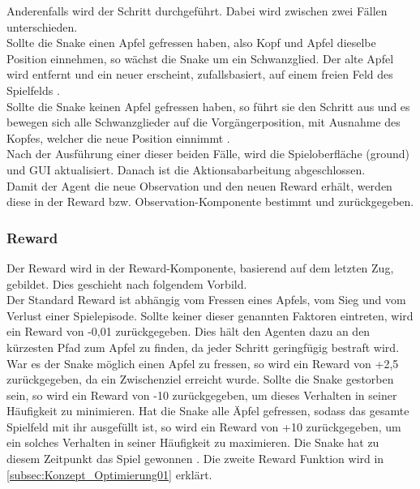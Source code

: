 Anderenfalls wird der Schritt durchgeführt. Dabei wird zwischen zwei Fällen unterschieden.\\
Sollte die Snake einen Apfel gefressen haben, also Kopf und Apfel dieselbe Position einnehmen, so wächst die Snake um ein Schwanzglied. Der alte Apfel wird entfernt und ein neuer erscheint, zufallsbasiert, auf einem freien Feld des Spielfelds .\\
Sollte die Snake keinen Apfel gefressen haben, so führt sie den Schritt aus und es bewegen sich alle Schwanzglieder auf die Vorgängerposition, mit Ausnahme des Kopfes, welcher die neue Position einnimmt .\\
Nach der Ausführung einer dieser beiden Fälle, wird die Spieloberfläche (ground) und GUI aktualisiert. Danach ist die Aktionsabarbeitung abgeschlossen.\\
Damit der Agent die neue Observation und den neuen Reward erhält, werden diese in der Reward bzw. Observation-Komponente bestimmt und zurückgegeben.

\subsubsection{Reward} \label{subsubsec:Konzept_Reward}
Der Reward wird in der Reward-Komponente, basierend auf dem letzten Zug, gebildet. Dies geschieht nach folgendem Vorbild.\\
Der Standard Reward ist abhängig vom Fressen eines Apfels, vom Sieg und vom Verlust einer Spielepisode. Sollte keiner dieser genannten Faktoren eintreten, wird ein Reward von -0,01 zurückgegeben. Dies hält den Agenten dazu an den kürzesten Pfad zum Apfel zu finden, da jeder Schritt geringfügig bestraft wird.
War es der Snake möglich einen Apfel zu fressen, so wird ein Reward von +2,5 zurückgegeben, da ein Zwischenziel erreicht wurde.
Sollte die Snake gestorben sein, so wird ein Reward von -10 zurückgegeben, um dieses Verhalten in seiner Häufigkeit zu minimieren.
Hat die Snake alle Äpfel gefressen, sodass das gesamte Spielfeld mit ihr ausgefüllt ist, so wird ein Reward von +10 zurückgegeben, um ein solches Verhalten in seiner Häufigkeit zu maximieren.
Die Snake hat zu diesem Zeitpunkt das Spiel gewonnen .
Die zweite Reward Funktion wird in \autoref{subsec:Konzept_Optimierung01} erklärt.


